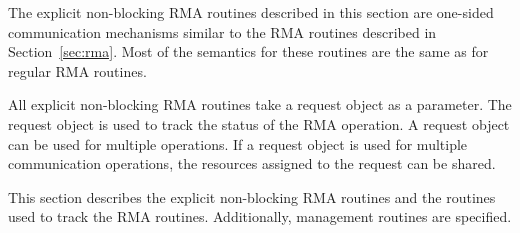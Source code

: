 The explicit non-blocking \ac{RMA} routines described in this section are
one-sided communication mechanisms similar to the \ac{RMA} routines
described in Section~\ref{sec:rma}. Most of the semantics for these
routines are the same as for regular \ac{RMA} routines.

All explicit non-blocking \ac{RMA} routines take a request object as a
parameter. The request object is used to track the status of the \ac{RMA}
operation. A request object can be used for multiple operations. If a
request object is used for multiple communication operations, the
resources assigned to the request can be shared.

This section describes the explicit non-blocking \ac{RMA}
routines and the routines used to track the \ac{RMA} routines.
Additionally, management routines are specified.
